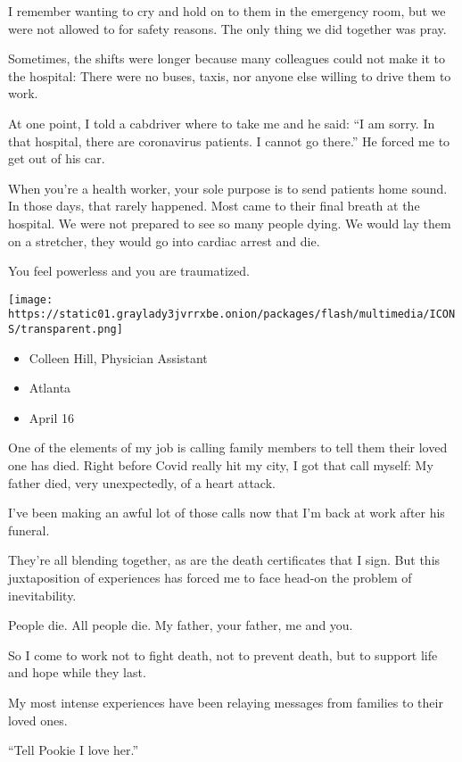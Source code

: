 I remember wanting to cry and hold on to them in the emergency room, but
we were not allowed to for safety reasons. The only thing we did
together was pray.

Sometimes, the shifts were longer because many colleagues could not make
it to the hospital: There were no buses, taxis, nor anyone else willing
to drive them to work.

At one point, I told a cabdriver where to take me and he said: ``I am
sorry. In that hospital, there are coronavirus patients. I cannot go
there.'' He forced me to get out of his car.

When you're a health worker, your sole purpose is to send patients home
sound. In those days, that rarely happened. Most came to their final
breath at the hospital. We were not prepared to see so many people
dying. We would lay them on a stretcher, they would go into cardiac
arrest and die.

You feel powerless and you are traumatized.

\texttt{[image: https://static01.graylady3jvrrxbe.onion/packages/flash/multimedia/ICONS/transparent.png]}

\begin{itemize}
\tightlist
\item
  Colleen Hill, Physician Assistant
\item
  Atlanta
\item
  April 16
\end{itemize}

One of the elements of my job is calling family members to tell them
their loved one has died. Right before Covid really hit my city, I got
that call myself: My father died, very unexpectedly, of a heart attack.

I've been making an awful lot of those calls now that I'm back at work
after his funeral.

They're all blending together, as are the death certificates that I
sign. But this juxtaposition of experiences has forced me to face
head-on the problem of inevitability.

People die. All people die. My father, your father, me and you.

So I come to work not to fight death, not to prevent death, but to
support life and hope while they last.

My most intense experiences have been relaying messages from families to
their loved ones.

``Tell Pookie I love her.''

